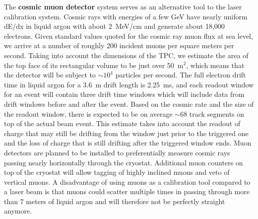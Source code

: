 The {\bf cosmic muon detector} system serves as an alternative tool to the laser calibration system. Cosmic rays with energies of a few GeV 
have nearly uniform dE/dx in liquid argon with about 2~MeV/cm and generate about 18,000 electrons. %
Given standard values quoted for the cosmic ray muon flux at sea level, we arrive at a number of roughly 200 incident muons per square meters per second.  Taking into account the dimensions of the TPC, we estimate the area of the top face of its rectangular volume to be just over 50~m$^{2}$, which means that the detector will be subject to $\sim10^{4}$ particles per second.  The full electron drift time in liquid argon for a 3.6~m drift length is 2.25~ms, and each readout window for an event will contain three drift time windows which will include data from drift windows before and after the event.  Based on the cosmic rate and the size of the readout window, there is expected to be on average $\sim$68 track segments on top of the actual beam event.  This estimate takes into account the readout of charge that may still be drifting from the window just prior to the triggered one and the loss of charge that is still drifting after the triggered window ends.    Muon detectors are planned to be installed to preferentially measure cosmic rays passing nearly horizontally through the cryostat.
Additional muon counters on top of the cryostat will allow tagging of highly inclined muons and veto of vertical muons. 
  A disadvantage of using muons as a calibration tool compared to a laser beam is that muons could scatter multiple times in passing 
  through more than 7 meters of liquid argon and will therefore not be perfectly straight anymore.
  
